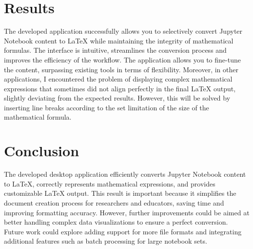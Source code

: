 \documentclass{article}
\begin{document}
\begin{multicols}{2}
\section{Results}
The developed application successfully allows you to selectively convert Jupyter Notebook content to LaTeX while maintaining the integrity of mathematical formulas. The interface is intuitive, streamlines the conversion process and improves the efficiency of the workflow. The application allows you to fine-tune the content, surpassing existing tools in terms of flexibility. Moreover, in other applications, I encountered the problem of displaying complex mathematical expressions that sometimes did not align perfectly in the final LaTeX output, slightly deviating from the expected results. However, this will be solved by inserting line breaks according to the set limitation of the size of the mathematical formula.

\section{Conclusion}
The developed desktop application efficiently converts Jupyter Notebook content to LaTeX, correctly represents mathematical expressions, and provides customizable LaTeX output. This result is important because it simplifies the document creation process for researchers and educators, saving time and improving formatting accuracy. However, further improvements could be aimed at better handling complex data visualizations to ensure a perfect conversion. Future work could explore adding support for more file formats and integrating additional features such as batch processing for large notebook sets.


\end{multicols}
\end{document}
